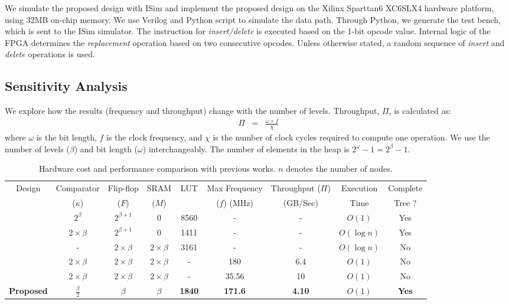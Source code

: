 We simulate the proposed design with ISim and implement the proposed design on the Xilinx Sparttan6 XC6SLX4 hardware platform, using 32MB on-chip memory.
We use Verilog and Python script to simulate the data path.
Through Python, we generate the test bench, which is sent to the ISim simulator.
The instruction for {\it insert/delete} is executed based on the 1-bit opcode value.
Internal logic of the FPGA determines the {\it replacement} operation based on two consecutive opcodes.
Unless otherwise stated, a random sequence of {\it insert} and {\it delete} operations is used.

\subsection{Sensitivity Analysis}
We explore how the results (frequency and throughput) change with the number of levels.
Throughput, $\Pi$, is calculated as:
\begin{eqnarray}
\Pi &=&  \frac{\omega \times  f}{\chi}
\end{eqnarray}
 where $\omega$ is the bit length, $f$ is the clock frequency, and $\chi$ is the number of clock cycles required to compute one operation.
We use the number of levels ($\beta$) and bit length ($\omega$) interchangeably.
The number of elements in the heap is $2^\omega-1 = 2^\beta -1$.

\begin{table}
 \begin{center}
 \caption{Hardware cost and performance comparison with previous works. $n$ denotes the number of nodes.}
\label{table4}
\begin{tabular}{ |c|c|c|c|c|c|c|c|c| }
 \hline
 Design  & Comparator  & Flip-flop & SRAM & LUT &Max Frequency & Throughput ($\Pi$) & Execution & Complete \\
  & ($\kappa$)& ($F$)& ($M$) &  & ($f$) (MHz) & (GB/Sec) & Time & Tree ?\\
 \hline
 \hline
 \cite{hw8} & $2^\beta$ & $2^{\beta +1}$& 0 & 8560 & - & - & $O(1)$ & Yes\\
 \hline
 \cite{hw11} & $2 \times \beta$ & $2^{\beta +1}$ & 0 & 1411 & - & - & $O(\log n)$ & Yes\\
 \hline
 \cite{hwsw1} & - & $2 \times \beta$ & $2 \times \beta$ & 3161 & - & - & $O(\log n)$ & No\\
 \hline
 \cite{fpga1} & $2 \times \beta$ & $2 \times \beta$ & $2 \times \beta$ & - & 180 &6.4 & $O(1)$ & No\\
 \hline
 \cite{hw2} & $2 \times \beta$ & $2 \times \beta$ & $2 \times \beta$ & - & 35.56 &10 & $O(1)$ & No\\
 \hline 
{\bf Proposed} & {\bf $\frac{\beta}{2}$} & {\bf $\beta$} & {\bf $\beta$} & {\bf 1840} & {\bf 171.6} & {\bf 4.10} & {\bf $O(1)$} & {\bf Yes}\\
 \hline
\end{tabular}
\end{center}
\end{table}

